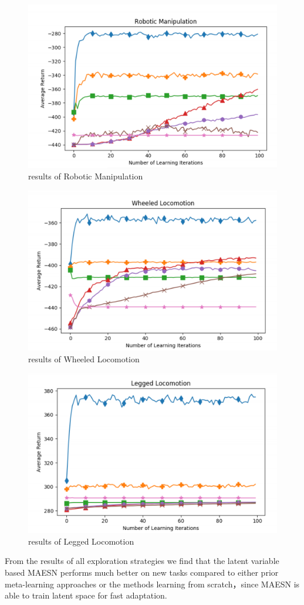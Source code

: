 \begin{figure}[H]
	\includegraphics[scale=0.6]{MAESN_09.PNG}
	\centering
	\caption{results of Robotic Manipulation}
	\label{MAESN}
\end{figure}
\begin{figure}[H]
	\includegraphics[scale=0.6]{MAESN_10.PNG}
	\centering
	\caption{results of Wheeled Locomotion}
	\label{MAESN}
\end{figure}
\begin{figure}[H]
	\includegraphics[scale=0.6]{MAESN_11.PNG}
	\centering
	\caption{results of Legged Locomotion}
	\label{MAESN}
\end{figure}
From the results of all exploration strategies we find that the latent variable based MAESN performs much better on new tasks compared to either prior meta-learning approaches or the methods learning from scratch，since MAESN is able to train latent space for fast adaptation.









